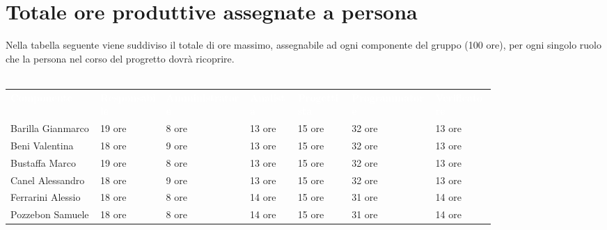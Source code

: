 \section{Totale ore produttive assegnate a persona}
Nella tabella seguente viene suddiviso il totale di ore massimo, assegnabile ad ogni componente del gruppo
(100 ore), per ogni singolo ruolo che la persona nel corso del progretto dovrà ricoprire.\\\\
{\renewcommand{\arraystretch}{1.5}
\scriptsize
\begin{tabular}{p{0.15\linewidth}p{0.11\linewidth}p{0.14\linewidth}p{0.08\linewidth}p{0.09\linewidth}p{0.14\linewidth}p{0.10\linewidth}}
	\rowcolor[RGB]{33, 73, 50}
	\textcolor{white}{\textbf{Componente}} & \textcolor{white}{\textbf{Responsabile}} & \textcolor{white}
	{\textbf{Amministratore}} & \textcolor{white}{\textbf{Analista}} & \textcolor{white}
	{\textbf{Progettista}} & \textcolor{white}{\textbf{Programmatore}} & \textcolor{white}{\textbf{Verificatore}}\\
	\rowcolor[RGB]{216, 235, 171}
	Barilla Gianmarco & 19 ore & 8 ore & 13 ore & 15 ore & 32 ore & 13 ore        	\\
	\rowcolor[RGB]{233, 245, 206}
	Beni Valentina & 18 ore & 9 ore & 13 ore & 15 ore & 32 ore & 13 ore        	\\
	\rowcolor[RGB]{216, 235, 171}
	Bustaffa Marco & 19 ore & 8 ore & 13 ore & 15 ore & 32 ore & 13 ore      	\\
    \rowcolor[RGB]{233, 245, 206}
	Canel Alessandro & 18 ore & 9 ore & 13 ore & 15 ore & 32 ore & 13 ore     	\\
    \rowcolor[RGB]{216, 235, 171}
	Ferrarini Alessio & 18 ore & 8 ore & 14 ore & 15 ore & 31 ore & 14 ore     	\\
    \rowcolor[RGB]{233, 245, 206}
	Pozzebon Samuele & 18 ore & 8 ore & 14 ore & 15 ore & 31 ore & 14 ore    	\\
\end{tabular}	
}